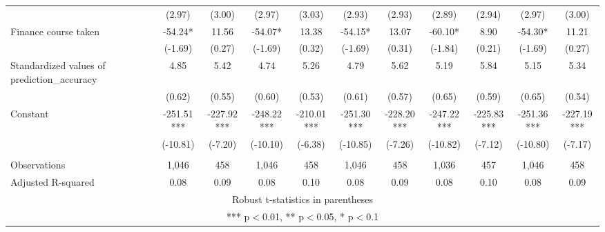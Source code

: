 \documentclass[]{article}
\begin{document}
\begin{tabular}{lcccccccccc}
 & (2.97) & (3.00) & (2.97) & (3.03) & (2.93) & (2.93) & (2.89) & (2.94) & (2.97) & (3.00) \\
Finance course taken & -54.24* & 11.56 & -54.07* & 13.38 & -54.15* & 13.07 & -60.10* & 8.90 & -54.30* & 11.21 \\
 & (-1.69) & (0.27) & (-1.69) & (0.32) & (-1.69) & (0.31) & (-1.84) & (0.21) & (-1.69) & (0.27) \\
Standardized values of prediction\_accuracy & 4.85 & 5.42 & 4.74 & 5.26 & 4.79 & 5.62 & 5.19 & 5.84 & 5.15 & 5.34 \\
 & (0.62) & (0.55) & (0.60) & (0.53) & (0.61) & (0.57) & (0.65) & (0.59) & (0.65) & (0.54) \\
Constant & -251.51*** & -227.92*** & -248.22*** & -210.01*** & -251.30*** & -228.20*** & -247.22*** & -225.83*** & -251.36*** & -227.19*** \\
 & (-10.81) & (-7.20) & (-10.10) & (-6.38) & (-10.85) & (-7.26) & (-10.82) & (-7.12) & (-10.80) & (-7.17) \\
 &  &  &  &  &  &  &  &  &  &  \\
Observations & 1,046 & 458 & 1,046 & 458 & 1,046 & 458 & 1,036 & 457 & 1,046 & 458 \\
 Adjusted R-squared & 0.08 & 0.09 & 0.08 & 0.10 & 0.08 & 0.09 & 0.08 & 0.10 & 0.08 & 0.09 \\ \hline
\multicolumn{11}{c}{ Robust t-statistics in parentheses} \\
\multicolumn{11}{c}{ *** p$<$0.01, ** p$<$0.05, * p$<$0.1} \\
\end{tabular}
\end{document}
